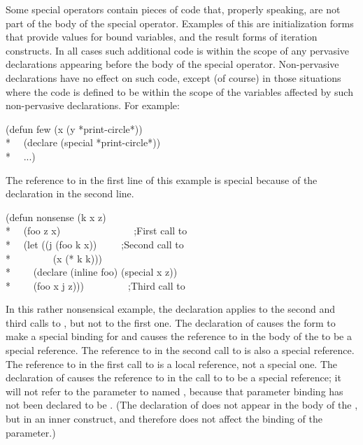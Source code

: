 \begin{defspec}
Some special operators contain pieces of code that, properly speaking,
are not part of the body of the special operator.  Examples of this
are initialization forms that provide values for bound variables,
and the result forms of iteration constructs.
In all cases such additional code is within the scope of any pervasive
declarations appearing before the body of the special operator.
Non-pervasive declarations have no effect on such code, except (of course)
in those situations where the code is defined to be within the scope
of the variables affected by such non-pervasive declarations.
For example:
\begin{lisp}
(defun few (x  (y *print-circle*)) \\*
~~(declare (special *print-circle*)) \\*
~~...)
\end{lisp}
The reference to  in the first line of this example is special
because of the declaration in the second line.
\begin{lisp}
(defun nonsense (k x z) \\*
~~(foo z x)~~~~~~~~~~~~~~~;\textrm{First call to } \\*
~~(let ((j (foo k x))~~~~~;\textrm{Second call to } \\*
~~~~~~~~(x (* k k))) \\*
~~~~(declare (inline foo) (special x z)) \\*
~~~~(foo x j z)))~~~~~~~~~;\textrm{Third call to }
\end{lisp}
In this rather nonsensical example,
the  declaration applies to the
second and third calls to , but not to the first one.
The  declaration of  causes the  form
to make a special binding for  and causes the reference to 
in the body of the  to be a special reference.
The reference to  in the second call to  is also a special
reference.
The reference to  in the first call to  is a local
reference, not a special one.  The  declaration of 
causes the reference to  in the call
to  to be a special reference; it will not
refer to the parameter to  named , because that
parameter binding has not been declared to be .
(The  declaration of  does not appear in the body
of the , but in an inner construct, and therefore does not
affect the binding of the parameter.)


\end{defspec}
